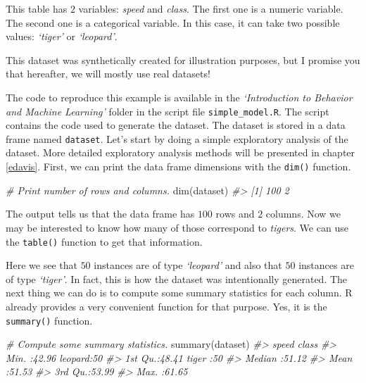 \documentclass[
  11pt,
]{krantz}
\newenvironment{Shaded}{\begin{snugshade}}{\end{snugshade}}
\newcommand{\CommentTok}[1]{\textcolor[rgb]{0.37,0.37,0.37}{\textit{#1}}}
\newcommand{\FunctionTok}[1]{\textcolor[rgb]{0,0,0}{#1}}
\newcommand{\NormalTok}[1]{#1}
\newcommand{\SpecialCharTok}[1]{\textcolor[rgb]{0,0,0}{#1}}
\begin{document}
This table has \(2\) variables: \emph{speed} and \emph{class}. The first one is a numeric variable. The second one is a categorical variable. In this case, it can take two possible values: \emph{`tiger'} or \emph{`leopard'}.

This dataset was synthetically created for illustration purposes, but I promise you that hereafter, we will mostly use real datasets!

The code to reproduce this example is available in the \emph{`Introduction to Behavior and Machine Learning'} folder in the script file \texttt{simple\_model.R}. The script contains the code used to generate the dataset. The dataset is stored in a data frame named \texttt{dataset}. Let's start by doing a simple exploratory analysis of the dataset. More detailed exploratory analysis methods will be presented in chapter \ref{edavis}. First, we can print the data frame dimensions with the \texttt{dim()} function.

\begin{Shaded}
\begin{Highlighting}[]
\CommentTok{\# Print number of rows and columns.}
\FunctionTok{dim}\NormalTok{(dataset)}
\CommentTok{\#\textgreater{} [1] 100   2}
\end{Highlighting}
\end{Shaded}

The output tells us that the data frame has \(100\) rows and \(2\) columns. Now we may be interested to know how many of those correspond to \emph{tigers}. We can use the \texttt{table()} function to get that information.

\begin{Shaded}
\end{Shaded}

Here we see that \(50\) instances are of type \emph{`leopard'} and also that \(50\) instances are of type \emph{`tiger'}. In fact, this is how the dataset was intentionally generated. The next thing we can do is to compute some summary statistics for each column. R already provides a very convenient function for that purpose. Yes, it is the \texttt{summary()} function.

\begin{Shaded}
\begin{Highlighting}[]
\CommentTok{\# Compute some summary statistics.}
\FunctionTok{summary}\NormalTok{(dataset)}
\CommentTok{\#\textgreater{}      speed           class   }
\CommentTok{\#\textgreater{}  Min.   :42.96   leopard:50  }
\CommentTok{\#\textgreater{}  1st Qu.:48.41   tiger  :50  }
\CommentTok{\#\textgreater{}  Median :51.12               }
\CommentTok{\#\textgreater{}  Mean   :51.53               }
\CommentTok{\#\textgreater{}  3rd Qu.:53.99               }
\CommentTok{\#\textgreater{}  Max.   :61.65               }
\end{Highlighting}
\end{Shaded}
\end{document}
